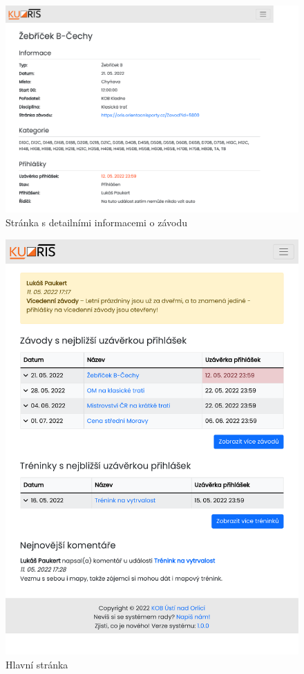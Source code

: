 \begin{figure}[h]
    \caption{Stránka s detailními informacemi o závodu}
    \centering
    \includegraphics[width=0.995\linewidth, cfbox=kuorisgray 0.5pt 0pt]{images/appendix-detail.pdf}
\end{figure}

\begin{figure}[ht!]
    \caption{Hlavní stránka}
    \centering
    \includegraphics[width=0.995\linewidth, trim={0 1pt 0 0}, cfbox=kuorisgray 0.5pt 0pt]{images/appendix-homepage.pdf}
    \vspace{12.2mm}
\end{figure}
